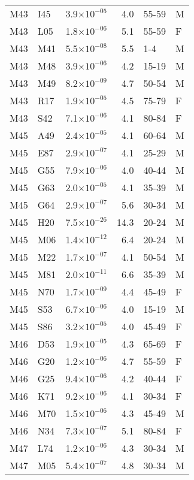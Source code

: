 \begin{longtable}{lllrll}
   M43 & I45 & 3.9$\times10^{-05}$ & 4.0 & 55-59 & M \\ 
   M43 & L05 & 1.8$\times10^{-06}$ & 5.1 & 55-59 & F \\ 
   M43 & M41 & 5.5$\times10^{-08}$ & 5.5 & 1-4 & M \\ 
   M43 & M48 & 3.9$\times10^{-06}$ & 4.2 & 15-19 & M \\ 
   M43 & M49 & 8.2$\times10^{-09}$ & 4.7 & 50-54 & M \\ 
   M43 & R17 & 1.9$\times10^{-05}$ & 4.5 & 75-79 & F \\ 
   M43 & S42 & 7.1$\times10^{-06}$ & 4.1 & 80-84 & F \\ 
   M45 & A49 & 2.4$\times10^{-05}$ & 4.1 & 60-64 & M \\ 
   M45 & E87 & 2.9$\times10^{-07}$ & 4.1 & 25-29 & M \\ 
   M45 & G55 & 7.9$\times10^{-06}$ & 4.0 & 40-44 & M \\ 
   M45 & G63 & 2.0$\times10^{-05}$ & 4.1 & 35-39 & M \\ 
   M45 & G64 & 2.9$\times10^{-07}$ & 5.6 & 30-34 & M \\ 
   M45 & H20 & 7.5$\times10^{-26}$ & 14.3 & 20-24 & M \\ 
   M45 & M06 & 1.4$\times10^{-12}$ & 6.4 & 20-24 & M \\ 
   M45 & M22 & 1.7$\times10^{-07}$ & 4.1 & 50-54 & M \\ 
   M45 & M81 & 2.0$\times10^{-11}$ & 6.6 & 35-39 & M \\ 
   M45 & N70 & 1.7$\times10^{-09}$ & 4.4 & 45-49 & F \\ 
   M45 & S53 & 6.7$\times10^{-06}$ & 4.0 & 15-19 & M \\ 
   M45 & S86 & 3.2$\times10^{-05}$ & 4.0 & 45-49 & F \\ 
   M46 & D53 & 1.9$\times10^{-05}$ & 4.3 & 65-69 & F \\ 
   M46 & G20 & 1.2$\times10^{-06}$ & 4.7 & 55-59 & F \\ 
   M46 & G25 & 9.4$\times10^{-06}$ & 4.2 & 40-44 & F \\ 
   M46 & K71 & 9.2$\times10^{-06}$ & 4.1 & 30-34 & F \\ 
   M46 & M70 & 1.5$\times10^{-06}$ & 4.3 & 45-49 & M \\ 
   M46 & N34 & 7.3$\times10^{-07}$ & 5.1 & 80-84 & F \\ 
   M47 & L74 & 1.2$\times10^{-06}$ & 4.3 & 30-34 & M \\ 
   M47 & M05 & 5.4$\times10^{-07}$ & 4.8 & 30-34 & M \\ 

\end{longtable}
